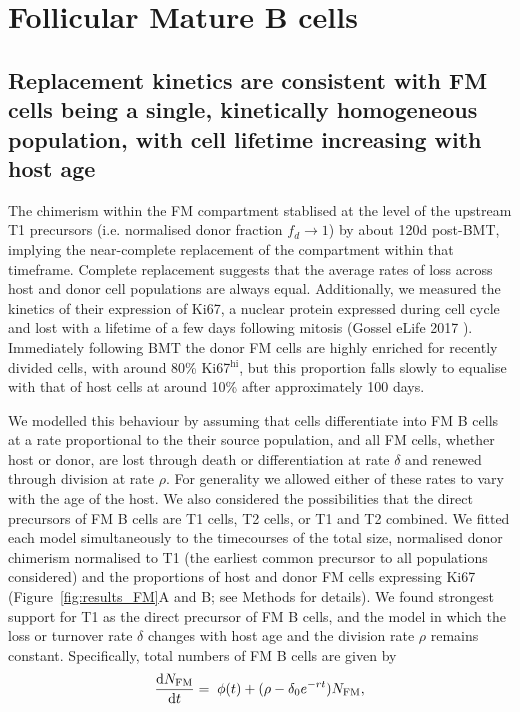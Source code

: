\documentclass[11pt]{article}
\newcommand{\ddt}[1]{\ensuremath{\frac{{\rm d}#1}{{\rm d}t}}}  %
\newcommand{\red}[1]{{\color{red}{#1}}}
\newcommand{\be}{\begin{equation}}
\newcommand{\ee}{\end{equation}}
\newcommand{\khi}{Ki67$^\text{hi}$}
\newcommand{\klo}{Ki67$^\text{lo}$}
\begin{document}
	\section*{Follicular Mature B cells}
	
	\subsection*{Replacement kinetics are consistent with FM cells being a single, kinetically homogeneous population, with cell lifetime increasing with host age}
	The chimerism within the FM compartment stablised at the level of the upstream T1 precursors (i.e. normalised donor fraction $f_{d} \rightarrow 1$) by about 120d post-BMT, implying the near-complete replacement of the compartment within that timeframe. Complete replacement suggests that the average rates of loss across host and donor cell populations are always equal.
	Additionally, we measured the kinetics of their expression of Ki67, a nuclear protein expressed during cell cycle and lost with a lifetime of a few days following mitosis (Gossel eLife 2017 \red{and others - see refs in that paper}). Immediately following BMT the donor FM cells are highly enriched for recently divided cells, with around 80\% \khi, but this proportion falls slowly to equalise with that of host cells at around 10\% after approximately 100 days. \red{This kinetic is consistent with IDEA HERE}
	
	
	We modelled this behaviour by assuming that cells differentiate into FM B cells at a rate proportional to the their source population, and all FM cells, whether host or donor, are lost through death or differentiation  at rate $\delta$ and renewed through division  at rate $\rho$. For generality we allowed either of these rates to vary with the age of the host. We also considered the possibilities that the direct precursors of FM B cells are T1 cells, T2 cells, or T1 and T2 combined. We fitted each model  simultaneously to the timecourses of the total size, normalised donor chimerism normalised to T1 (the earliest common precursor to all populations considered) and the proportions of host and donor FM cells expressing Ki67 (Figure~\ref{fig:results_FM}A and B; see Methods for details). We found strongest support for T1 as the direct precursor of FM B cells, and the model in which the loss or turnover rate $\delta$ changes with host age and the division rate $\rho$ remains constant. Specifically, total numbers of FM B cells are given by
	\be
	\ddt{N_\text{FM}} = \;  \phi(t) + (\rho - \delta_{0}e^{-rt}) N_\text{FM},
	\label{eq:FM_total}
	\ee
	
\end{document}
